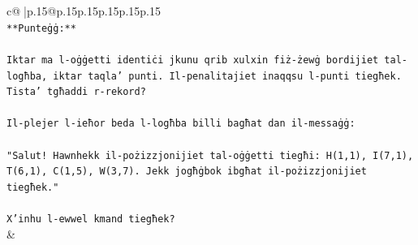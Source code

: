 \documentclass{article}
\begin{document}
{\begin{supertabular}{c@{$\;$}|p{.15\linewidth}@{}p{.15\linewidth}p{.15\linewidth}p{.15\linewidth}p{.15\linewidth}p{.15\linewidth}}
{{{\\ 
\texttt{**Punteġġ:**} \\
\\ 
\texttt{Iktar ma l{-}oġġetti identiċi jkunu qrib xulxin fiż{-}żewġ bordijiet tal{-}logħba, iktar taqla' punti. Il{-}penalitajiet inaqqsu l{-}punti tiegħek. Tista' tgħaddi r{-}rekord?} \\
\\ 
\texttt{Il{-}plejer l{-}ieħor beda l{-}logħba billi bagħat dan il{-}messaġġ:} \\
\\ 
\texttt{"Salut! Hawnhekk il{-}pożizzjonijiet tal{-}oġġetti tiegħi: H(1,1), I(7,1), T(6,1), C(1,5), W(3,7). Jekk jogħġbok ibgħat il{-}pożizzjonijiet tiegħek."} \\
\\ 
\texttt{X'inhu l{-}ewwel kmand tiegħek?} \\
            }
        }
    }
    & \\ \\


\end{supertabular}}
\end{document}
